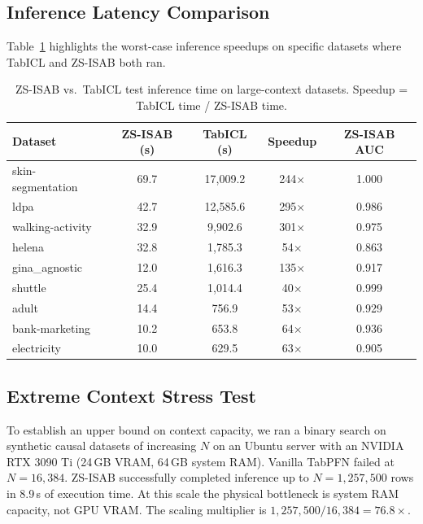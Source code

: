 \documentclass[10pt]{article}
\begin{document}
\subsection{Inference Latency Comparison}

Table~\ref{tab:speedup} highlights the worst-case inference speedups on specific datasets where TabICL and ZS-ISAB both ran.

\begin{table}[htbp]
\centering
\caption{ZS-ISAB vs.\ TabICL test inference time on large-context datasets. Speedup = TabICL time / ZS-ISAB time.}
\label{tab:speedup}
\small
\begin{tabular}{@{}lcccc@{}}
\toprule
\textbf{Dataset} & \textbf{ZS-ISAB (s)} & \textbf{TabICL (s)} & \textbf{Speedup} & \textbf{ZS-ISAB AUC} \\
\midrule
skin-segmentation         & 69.7  & 17{,}009.2 & 244$\times$ & 1.000 \\
ldpa                      & 42.7  & 12{,}585.6 & 295$\times$ & 0.986 \\
walking-activity          & 32.9  & 9{,}902.6  & 301$\times$ & 0.975 \\
helena                    & 32.8  & 1{,}785.3  & 54$\times$  & 0.863 \\
gina\_agnostic            & 12.0  & 1{,}616.3  & 135$\times$ & 0.917 \\
shuttle                   & 25.4  & 1{,}014.4  & 40$\times$  & 0.999 \\
adult                     & 14.4  & 756.9      & 53$\times$  & 0.929 \\
bank-marketing            & 10.2  & 653.8      & 64$\times$  & 0.936 \\
electricity               & 10.0  & 629.5      & 63$\times$  & 0.905 \\
\bottomrule
\end{tabular}
\end{table}

\subsection{Extreme Context Stress Test}

To establish an upper bound on context capacity, we ran a binary search on synthetic causal datasets of increasing $N$ on an Ubuntu server with an NVIDIA RTX 3090 Ti (24\,GB VRAM, 64\,GB system RAM). Vanilla TabPFN failed at $N = 16{,}384$. ZS-ISAB successfully completed inference up to $N = 1{,}257{,}500$ rows in 8.9\,s of execution time. At this scale the physical bottleneck is system RAM capacity, not GPU VRAM. The scaling multiplier is $1{,}257{,}500 / 16{,}384 = 76.8\times$.
\end{document}
